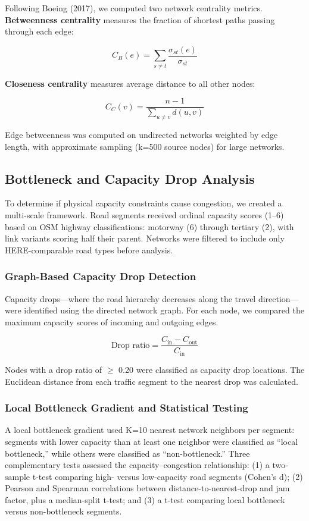 \documentclass[12pt,a4paper]{article}
\begin{document}
Following Boeing (2017), we computed two network centrality metrics. \textbf{Betweenness centrality} measures the fraction of shortest paths passing through each edge:

\[C_B(e) = \sum_{s \neq t} \frac{\sigma_{st}(e)}{\sigma_{st}}\]

\textbf{Closeness centrality} measures average distance to all other nodes:

\[C_C(v) = \frac{n-1}{\sum_{u \neq v} d(u,v)}\]

Edge betweenness was computed on undirected networks weighted by edge length, with approximate sampling (k=500 source nodes) for large networks.

\subsection{Bottleneck and Capacity Drop Analysis}

To determine if physical capacity constraints cause congestion, we created a multi-scale framework. Road segments received ordinal capacity scores (1–6) based on OSM highway classifications: motorway (6) through tertiary (2), with link variants scoring half their parent. Networks were filtered to include only HERE-comparable road types before analysis.

\subsubsection{Graph-Based Capacity Drop Detection}

Capacity drops—where the road hierarchy decreases along the travel direction—were identified using the directed network graph. For each node, we compared the maximum capacity scores of incoming and outgoing edges.

\[\text{Drop ratio} = \frac{C_{\text{in}} - C_{\text{out}}}{C_{\text{in}}}\]

Nodes with a drop ratio of  $\geq$ 0.20 were classified as capacity drop locations. The Euclidean distance from each traffic segment to the nearest drop was calculated.

\subsubsection{Local Bottleneck Gradient and Statistical Testing}

A local bottleneck gradient used K=10 nearest network neighbors per segment: segments with lower capacity than at least one neighbor were classified as “local bottleneck,” while others were classified as “non-bottleneck.” Three complementary tests assessed the capacity–congestion relationship: (1) a two-sample t-test comparing high- versus low-capacity road segments (Cohen’s d); (2) Pearson and Spearman correlations between distance-to-nearest-drop and jam factor, plus a median-split t-test; and (3) a t-test comparing local bottleneck versus non-bottleneck segments.
\end{document}
